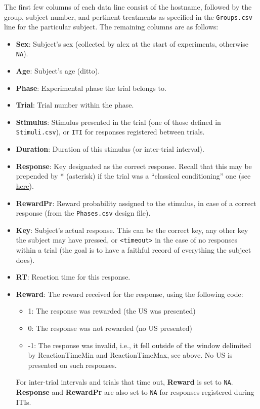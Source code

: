 \documentclass[11pt,]{article}
\begin{document}
The first few columns of each data line consist of the hostname,
followed by the group, subject number, and pertinent treatments as
specified in the \texttt{Groups.csv} line for the particular subject.
The remaining columns are as follows:

\begin{itemize}
\item
  \textbf{Sex}: Subject's sex (collected by alex at the start of
  experiments, otherwise \texttt{NA}).
\item
  \textbf{Age}: Subject's age (ditto).
\item
  \textbf{Phase}: Experimental phase the trial belongs to.
\item
  \textbf{Trial}: Trial number within the phase.
\item
  \textbf{Stimulus}: Stimulus presented in the trial (one of those
  defined in \texttt{Stimuli.csv}), or \texttt{ITI} for responses
  registered between trials.
\item
  \textbf{Duration}: Duration of this stimulus (or inter-trial
  interval).
\item
  \textbf{Response}: Key designated as the correct response. Recall that
  this may be prepended by * (asterisk) if the trial was a ``classical
  conditioning'' one (see \hyperref[responses]{here}).
\item
  \textbf{RewardPr}: Reward probability assigned to the stimulus, in
  case of a correct response (from the \texttt{Phases.csv} design file).
\item
  \textbf{Key}: Subject's actual response. This can be the correct key,
  any other key the subject may have pressed, or
  \texttt{\textless{}timeout\textgreater{}} in the case of no responses
  within a trial (the goal is to have a faithful record of everything
  the subject does).
\item
  \textbf{RT}: Reaction time for this response.
\item
  \textbf{Reward}: The reward received for the response, using the
  following code:

  \begin{itemize}
  \item
    1: The response was rewarded (the US was presented)
  \item
    0: The response was not rewarded (no US presented)
  \item
    -1: The response was invalid, i.e., it fell outside of the window
    delimited by ReactionTimeMin and ReactionTimeMax, see above. No US
    is presented on such responses.
  \end{itemize}

  For inter-trial intervals and trials that time out, \textbf{Reward} is
  set to \texttt{NA}. \textbf{Response} and \textbf{RewardPr} are also
  set to \texttt{NA} for responses registered during ITIs.
\end{itemize}
\end{document}
